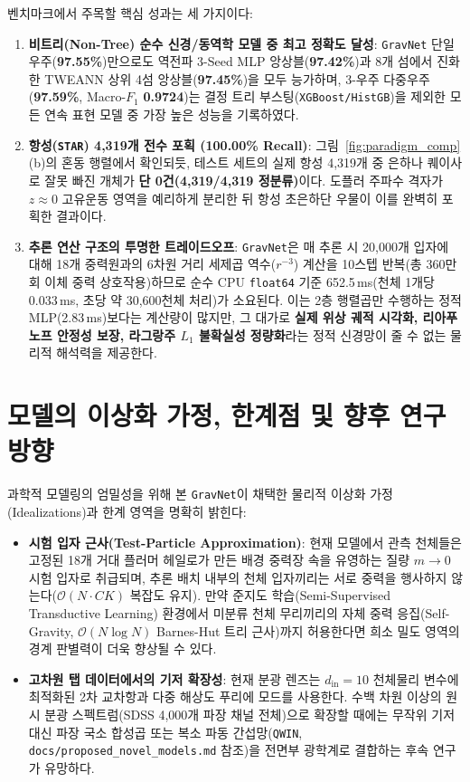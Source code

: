 \documentclass[11pt,a4paper]{article}
\begin{document}
벤치마크에서 주목할 핵심 성과는 세 가지이다:
\begin{enumerate}[leftmargin=18pt, itemsep=2pt]
  \item \textbf{비트리(Non-Tree) 순수 신경/동역학 모델 중 최고 정확도 달성}: \texttt{GravNet} 단일 우주(\textbf{97.55\%})만으로도 역전파 3-Seed MLP 앙상블(\textbf{97.42\%})과 8개 섬에서 진화한 TWEANN 상위 4섬 앙상블(\textbf{97.45\%})을 모두 능가하며, 3-우주 다중우주(\textbf{97.59\%}, Macro-$F_1$ \textbf{0.9724})는 결정 트리 부스팅(\texttt{XGBoost/HistGB})을 제외한 모든 연속 표현 모델 중 가장 높은 성능을 기록하였다.
  \item \textbf{항성(\texttt{STAR}) 4,319개 전수 포획 (100.00\% Recall)}: 그림~\ref{fig:paradigm_comp}(b)의 혼동 행렬에서 확인되듯, 테스트 세트의 실제 항성 4,319개 중 은하나 퀘이사로 잘못 빠진 개체가 \textbf{단 0건(4,319/4,319 정분류)}이다. 도플러 주파수 격자가 $z \approx 0$ 고유운동 영역을 예리하게 분리한 뒤 항성 초은하단 우물이 이를 완벽히 포획한 결과이다.
  \item \textbf{추론 연산 구조의 투명한 트레이드오프}: \texttt{GravNet}은 매 추론 시 20,000개 입자에 대해 18개 중력원과의 6차원 거리 세제곱 역수($r^{-3}$) 계산을 10스텝 반복(총 360만 회 이체 중력 상호작용)하므로 순수 CPU \texttt{float64} 기준 652.5\,ms(천체 1개당 0.033\,ms, 초당 약 30,600천체 처리)가 소요된다. 이는 2층 행렬곱만 수행하는 정적 MLP(2.83\,ms)보다는 계산량이 많지만, 그 대가로 \textbf{실제 위상 궤적 시각화, 리아푸노프 안정성 보장, 라그랑주 $L_1$ 불확실성 정량화}라는 정적 신경망이 줄 수 없는 물리적 해석력을 제공한다.
\end{enumerate}

\section{모델의 이상화 가정, 한계점 및 향후 연구 방향}

과학적 모델링의 엄밀성을 위해 본 \texttt{GravNet}이 채택한 물리적 이상화 가정(Idealizations)과 한계 영역을 명확히 밝힌다:
\begin{itemize}[leftmargin=18pt, itemsep=2pt]
  \item \textbf{시험 입자 근사(Test-Particle Approximation)}: 현재 모델에서 관측 천체들은 고정된 18개 거대 플러머 헤일로가 만든 배경 중력장 속을 유영하는 질량 $m \to 0$ 시험 입자로 취급되며, 추론 배치 내부의 천체 입자끼리는 서로 중력을 행사하지 않는다($\mathcal{O}(N \cdot C K)$ 복잡도 유지). 만약 준지도 학습(Semi-Supervised Transductive Learning) 환경에서 미분류 천체 무리끼리의 자체 중력 응집(Self-Gravity, $\mathcal{O}(N \log N)$ Barnes-Hut 트리 근사)까지 허용한다면 희소 밀도 영역의 경계 판별력이 더욱 향상될 수 있다.
  \item \textbf{고차원 탭 데이터에서의 기저 확장성}: 현재 분광 렌즈는 $d_{\text{in}}=10$ 천체물리 변수에 최적화된 2차 교차항과 다중 해상도 푸리에 모드를 사용한다. 수백 차원 이상의 원시 분광 스펙트럼(SDSS 4,000개 파장 채널 전체)으로 확장할 때에는 무작위 기저 대신 파장 국소 합성곱 또는 복소 파동 간섭망(\texttt{QWIN}, \texttt{docs/proposed\_novel\_models.md} 참조)을 전면부 광학계로 결합하는 후속 연구가 유망하다.
\end{itemize}
\end{document}
